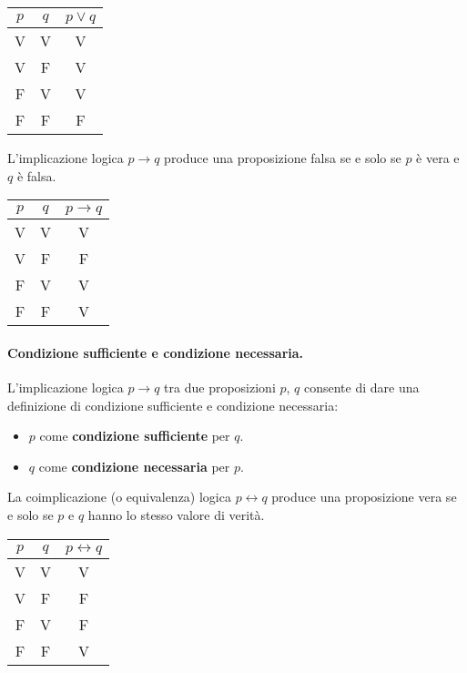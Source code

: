 \begin{center}
\begin{tabular}{|c|c||c|}
  \hline
  $p$ & $q$ & $p\lor q$\\
  \hline
  V & V & V \\
  V & F & V \\
  F & V & V \\
  F & F & F \\
  \hline
\end{tabular}
\end{center}
\begin{definition} L'implicazione logica $p \rightarrow q$ produce una proposizione falsa se e solo se $p$ è vera e $q$ è falsa.
\end{definition}
\begin{center}
\begin{tabular}{|c|c||c|}
  \hline
  $p$ & $q$ & $p\rightarrow q$\\
  \hline
  V & V & V \\
  V & F & F \\
  F & V & V \\
  F & F & V \\
  \hline
\end{tabular}
\end{center}
\paragraph{Condizione sufficiente e condizione necessaria.} L'implicazione logica $p \rightarrow q$ tra due proposizioni $p$, $q$ consente di dare una definizione di condizione sufficiente e condizione necessaria:
\begin{itemize}
    \item $p$ come \textbf{condizione sufficiente} per $q$.
    \item $q$ come \textbf{condizione necessaria} per $p$.
\end{itemize}
\begin{definition} La coimplicazione (o equivalenza) logica $p \leftrightarrow q$ produce una proposizione vera se e solo se $p$ e $q$ hanno lo stesso valore di verità.
\end{definition}
\begin{center}
\begin{tabular}{|c|c||c|}
  \hline
  $p$ & $q$ & $p\leftrightarrow q$\\
  \hline
  V & V & V \\
  V & F & F \\
  F & V & F \\
  F & F & V \\
  \hline
\end{tabular}
\end{center}
